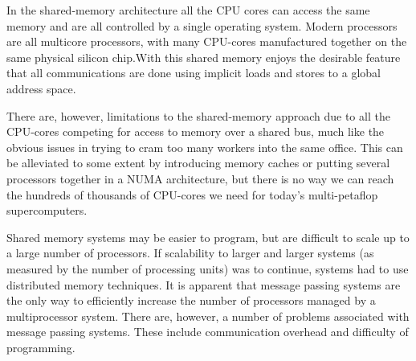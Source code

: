 \documentclass[11pt]{article}
\begin{document}
In the shared-memory architecture all the CPU cores can access the same memory and are all controlled by a single operating system. Modern processors are all multicore processors, with many CPU-cores manufactured together on the same physical silicon chip.With this shared memory enjoys the desirable feature that all
communications are done using implicit loads and stores to a global address space.

There are, however, limitations to the shared-memory approach due to all the CPU-cores competing for access to memory over a shared bus, much like the obvious issues in trying to cram too many workers into the same office. This can be alleviated to some extent by introducing memory caches or putting several processors together in a NUMA architecture, but there is no way we can reach the hundreds of thousands of CPU-cores we need for today’s multi-petaflop supercomputers.

Shared memory systems may be easier to program, but are difficult to scale up to a large number of processors. If scalability to larger and larger systems (as measured by the number of processing units) was to continue, systems had to use distributed memory techniques. It is apparent that message passing systems are the only way to efficiently increase the number of processors managed by a multiprocessor system.
There are, however, a number of problems associated with message passing systems.
These include communication overhead and difficulty of programming.



\end{document}
